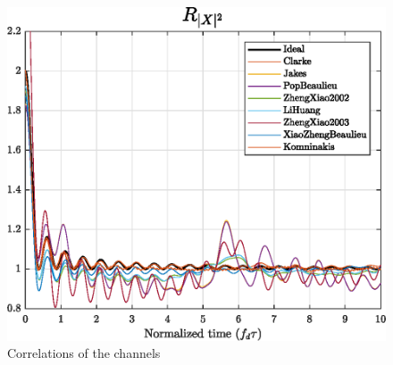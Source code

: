 \begin{figure}
\begin{minipage}{.32\linewidth}
		\includegraphics[width=\linewidth]{img/X2.eps}
	\end{minipage}
	\hfill
	
	\caption{Correlations of the channels}
	\label{fig:3xcorr}
\end{figure}

